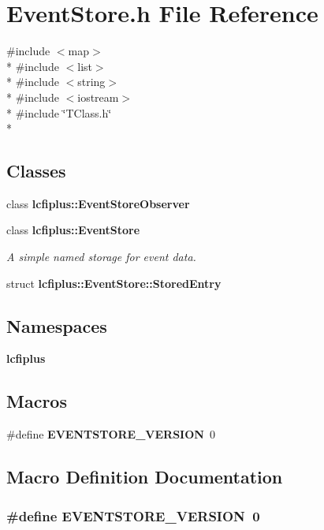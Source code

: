\section{Event\-Store.\-h File Reference}
\label{EventStore_8h}
{\ttfamily \#include $<$map$>$}\\*
{\ttfamily \#include $<$list$>$}\\*
{\ttfamily \#include $<$string$>$}\\*
{\ttfamily \#include $<$iostream$>$}\\*
{\ttfamily \#include \char`\"{}T\-Class.\-h\char`\"{}}\\*
\subsection*{Classes}
\begin{DoxyCompactItemize}
\item 
class {\bf lcfiplus\-::\-Event\-Store\-Observer}
\item 
class {\bf lcfiplus\-::\-Event\-Store}
\begin{DoxyCompactList}\small\item\em A simple named storage for event data. \end{DoxyCompactList}\item 
struct {\bf lcfiplus\-::\-Event\-Store\-::\-Stored\-Entry}
\end{DoxyCompactItemize}
\subsection*{Namespaces}
\begin{DoxyCompactItemize}
\item 
{\bf lcfiplus}
\end{DoxyCompactItemize}
\subsection*{Macros}
\begin{DoxyCompactItemize}
\item 
\#define {\bf E\-V\-E\-N\-T\-S\-T\-O\-R\-E\-\_\-\-V\-E\-R\-S\-I\-O\-N}~0
\end{DoxyCompactItemize}


\subsection{Macro Definition Documentation}
\subsubsection[{E\-V\-E\-N\-T\-S\-T\-O\-R\-E\-\_\-\-V\-E\-R\-S\-I\-O\-N}]{\setlength{\rightskip}{0pt plus 5cm}\#define E\-V\-E\-N\-T\-S\-T\-O\-R\-E\-\_\-\-V\-E\-R\-S\-I\-O\-N~0}\label{EventStore_8h_a9eb91b549ef5dd30a463406ebc32f21e}
